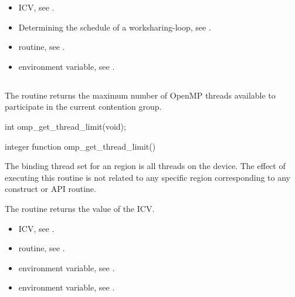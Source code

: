 \crossreferences
\begin{itemize}
\item {} ICV, see
.

\item Determining the schedule of a worksharing-loop, see
.

\item {} routine, see
.

\item {} environment variable, see
.
\end{itemize}



\subsection{}
\label{subsec:omp_get_thread_limit}
\summary
The  routine returns the maximum number of OpenMP
threads available to participate in the current contention group.

\format
\begin{ccppspecific}
\begin{ompcFunction}
int omp_get_thread_limit(void);
\end{ompcFunction}
\end{ccppspecific}

\begin{fortranspecific}
\begin{ompfFunction}
integer function omp_get_thread_limit()
\end{ompfFunction}
\end{fortranspecific}

\binding
The binding thread set for an  region is all 
threads on the device. The effect of executing this routine is not related 
to any specific region corresponding to any construct or API routine.

\effect
The  routine returns the value of the 
 ICV.

\crossreferences
\begin{itemize}
\item {} ICV, see
.

\item {} routine, see
.

\item {} environment variable, see
.

\item {} environment variable, see
.

\end{itemize}



